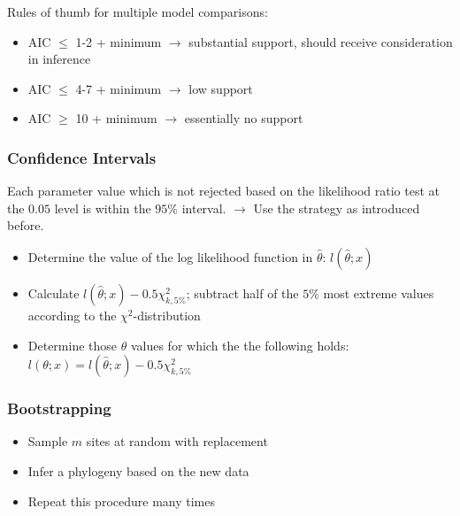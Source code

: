 \documentclass{article}
\begin{document}
\begin{multicols*}{3}
Rules of thumb for multiple model comparisons: 
\begin{itemize}
    \item AIC $\leq$ 1-2 + minimum $\rightarrow$ substantial support, should receive consideration in inference
    \item AIC $\leq$ 4-7 + minimum $\rightarrow$ low support
    \item AIC $\geq$ 10 + minimum $\rightarrow$ essentially no support
\end{itemize}

\subsubsection{Confidence Intervals}

Each parameter value which is not rejected based on the likelihood ratio test at the $0.05$ level is within the $95\%$ interval.
$\rightarrow$ Use the strategy as introduced before.
\begin{itemize}
    \item Determine the value of the log likelihood function in $\hat{\theta}$: $l(\hat{\theta};x)$
    \item Calculate $l(\hat{\theta};x) - 0.5\chi^2_{k,5\%}$; subtract half of the $5\%$ most extreme values according to the $\chi^2$-distribution
    \item Determine those $\theta$ values for which the the following holds: 
    $l(\theta;x) = l(\hat{\theta};x) - 0.5\chi^2_{k,5\%}$
\end{itemize}

\subsubsection{Bootstrapping}
\begin{itemize}
    \item Sample $m$ sites at random with replacement
    \item Infer a phylogeny based on the new data
    \item Repeat this procedure many times 
\end{itemize}


\end{multicols*}
\end{document}
